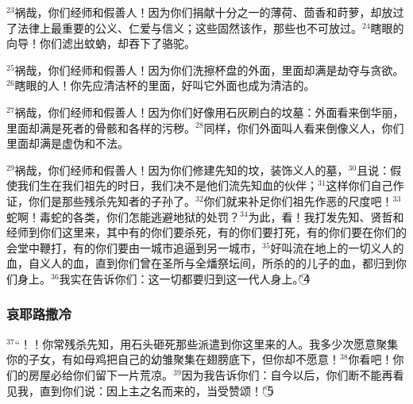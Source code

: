 $^{23}$祸哉，你们经师和\UL[法利塞]假善人！因为你们捐献十分之一的薄荷、茴香和莳萝，却放过了法律上最重要的公义、仁爱与信义；这些固然该作，那些也不可放过。$^{24}$瞎眼的向导！你们滤出蚊蚋，却吞下了骆驼。

$^{25}$祸哉，你们经师和\UL[法利塞]假善人！因为你们洗擦杯盘的外面，里面却满是劫夺与贪欲。$^{26}$瞎眼的\UL[法利塞]人！你先应清洁杯的里面，好叫它外面也成为清洁的。

$^{27}$祸哉，你们经师和\UL[法利塞]假善人！因为你们好像用石灰刷白的坟墓：外面看来倒华丽，里面却满是死者的骨骸和各样的污秽。$^{28}$同样，你们外面叫人看来倒像义人，你们里面却满是虚伪和不法。

$^{29}$祸哉，你们经师和\UL[法利塞]假善人！因为你们修建先知的坟，装饰义人的墓，$^{30}$且说：假使我们生在我们祖先的时日，我们决不是他们流先知血的伙伴；$^{31}$这样你们自己作证，你们是那些残杀先知者的子孙了。$^{32}$你们就来补足你们祖先作恶的尺度吧！$^{33}$蛇啊！毒蛇的各类，你们怎能逃避地狱的处罚？$^{34}$为此，看！我打发先知、贤哲和经师到你们这里来，其中有的你们要杀死，有的你们要打死，有的你们要在你们的会堂中鞭打，有的你们要由一城市追逼到另一城市，$^{35}$好叫流在地上的一切义人的血，自义人\UL[亚伯尔]的血，直到你们曾在圣所与全燔祭坛间，所杀的\UL[贝勒基雅]的儿子\UL[则加黎雅]的血，都归到你们身上。$^{36}$我实在告诉你们：这一切都要归到这一代人身上。”\textcircled{4}


\subsubsection{哀耶路撒冷}
$^{37}$“\UL[耶路撒冷]！\UL[耶路撒冷]！你常残杀先知，用石头砸死那些派遣到你这里来的人。我多少次愿意聚集你的子女，有如母鸡把自己的幼雏聚集在翅膀底下，但你却不愿意！$^{38}$你看吧！你们的房屋必给你们留下一片荒凉。$^{39}$因为我告诉你们：自今以后，你们断不能再看见我，直到你们说：因上主之名而来的，当受赞颂！”\textcircled{5}